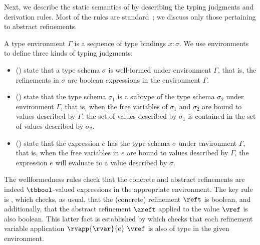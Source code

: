 

Next, we describe the static semantics of \corelan by describing the typing
judgments and derivation rules. Most of the rules are 
standard~\cite{Ou2004,LiquidPLDI08,Knowles10,GordonTOPLAS2011}; we 
discuss only those pertaining to abstract refinements.

A type environment $\Gamma$ is a sequence of type bindings $x:\sigma$.
We use environments to define three kinds of typing judgments:

\begin{itemize}
\item{ (\isWellFormed{\Gamma}{\sigma})} 
state that a type schema $\sigma$ is well-formed under environment
$\Gamma$, that is, the refinements in $\sigma$ are boolean 
expressions in the environment $\Gamma$.

\item{ ()} 
state that the type schema $\sigma_1$ is a subtype of the type schema
$\sigma_2$ under environment $\Gamma$, that is, when the free variables
of $\sigma_1$ and $\sigma_2$
are bound to values described by $\Gamma$, the set of values described
by $\sigma_1$ is contained in the set of values described by $\sigma_2$. 

\item{ ()} state that
the expression $e$ has the type schema $\sigma$ under environment $\Gamma$,
that is, when the free variables in $e$ are bound to values described by 
$\Gamma$, the expression $e$ will evaluate to a value described by $\sigma$.
\end{itemize}

The wellformedness rules check that the concrete and abstract
refinements are indeed $\tbbool$-valued expressions in the 
appropriate environment.
The key rule is \wtBase, which checks, as usual, that the (concrete) 
refinement $\reft$ is boolean, and additionally, that the abstract
refinement $\areft$ applied to the value $\vref$ is also boolean.
This latter fact is established by \wtRVApp which checks that 
each refinement variable application $\rvapp{\rvar}{e}\ \vref$ 
is also of type \tbbool in the given environment.

